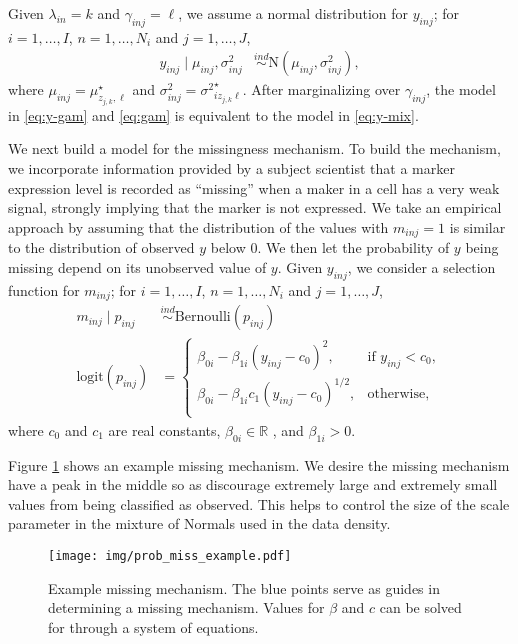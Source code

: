 \documentclass[12pt,]{article}
\newcommand{\p}[1]{\left(#1\right)}
\newcommand{\N}{ \mathcal{N} }
\def\beginmyfig{\begin{figure}[H]\center}
\def\endmyfig{\end{figure}}
\newcommand{\ind}{\overset{ind}{\sim}}
\def\logit{\text{logit}}
\def\Bern{\text{Bernoulli}}
\def\N{\text{N}}
\def\Prob{\text{Pr}}
\def\beginmyfig{\begin{figure}[H]\center}
\def\endmyfig{\end{figure}}
\begin{document}
Given \(\lambda_{in}=k\) and \(\gamma_{inj}=\ell\), we assume a normal
distribution for \(y_{inj}\); for \(i=1, \ldots, I\),
\(n=1, \ldots, N_i\) and \(j=1, \ldots, J\),
\begin{align}
  y_{inj} \mid \mu_{inj}, \sigma^2_{inj}  &\ind \N(\mu_{inj}, \sigma^2_{inj}), \label{eq:y-gam}
\end{align}
where \(\mu_{inj} = \mu^\star_{z_{j,k},\ell}\) and \(\sigma^2_{inj} =
{\sigma^{2}}^\star_{iz_{j,k}\ell}\). After marginalizing over $\gamma_{inj}$,
the model in \eqref{eq:y-gam} and \eqref{eq:gam} is equivalent to the model in
\eqref{eq:y-mix}.  

We next build a model for the missingness mechanism.
To build the mechanism, we incorporate information provided by a subject
scientist that a marker expression level is recorded as ``missing'' when a
maker in a cell has a very weak signal, strongly implying that the marker is
not expressed.
We take an empirical approach by assuming that the distribution of the values
with $m_{inj}=1$ is similar to the distribution of observed $y$ below 0. We
then let the probability of $y$ being missing depend on its unobserved value of
$y$.
%
Given
\(y_{inj}\), we consider a selection function for \(m_{inj}\); for
\(i=1, \ldots, I\), \(n=1, \ldots, N_i\) and \(j=1, \ldots, J\),
\begin{align}
  m_{inj} \mid p_{inj} &\ind \Bern(p_{inj}) \nonumber \\
  \logit(p_{inj}) &= \begin{cases}
  \beta_{0i} - \beta_{1i}(y_{inj}-c_0)^2, & \text{if } y_{inj} < c_0\nonumber, \\
  \beta_{0i} - \beta_{1i}c_1\p{y_{inj}-c_0}^{1/2}, & \text{otherwise}, \nonumber \\
  \end{cases} \label{eq:missing}
\end{align}
where \(c_0\) and \(c_1\) are real constants, $\beta_{0i} \in \mathbb{R}$ , and
$\beta_{1i} > 0$.

Figure \ref{fig:prob-miss-eg} shows an example missing mechanism. We desire the
missing mechanism have a peak in the middle so as discourage extremely large
and extremely small values from being classified as observed. This helps to
control the size of the scale parameter in the mixture of Normals used in the
data density.
\beginmyfig
\texttt{[image: img/prob\_miss\_example.pdf]}
\caption{Example missing mechanism. The blue points serve as guides in
determining a missing mechanism. Values for $\beta$ and $c$ can be solved for
through a system of equations.}
\label{fig:prob-miss-eg}
\endmyfig
\end{document}
